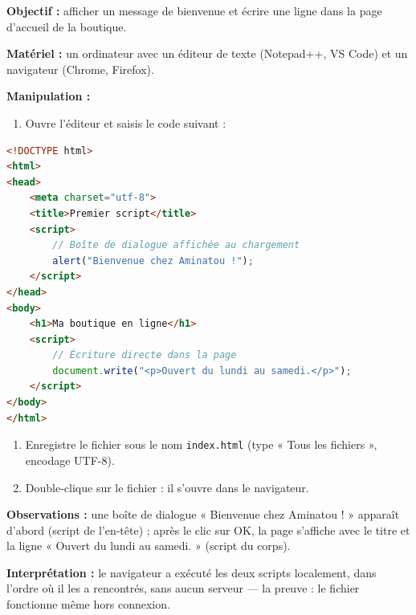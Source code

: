 \documentclass[11pt]{article}
\begin{document}
\begin{experience}
\textbf{Objectif :} afficher un message de bienvenue et écrire une ligne dans la page d'accueil de la boutique.

\textbf{Matériel :} un ordinateur avec un éditeur de texte (Notepad++, VS Code) et un navigateur (Chrome, Firefox).

\textbf{Manipulation :}
\begin{enumerate}
\item Ouvre l'éditeur et saisis le code suivant :
\end{enumerate}
\begin{lstlisting}[language=HTML]
<!DOCTYPE html>
<html>
<head>
    <meta charset="utf-8">
    <title>Premier script</title>
    <script>
        // Boîte de dialogue affichée au chargement
        alert("Bienvenue chez Aminatou !");
    </script>
</head>
<body>
    <h1>Ma boutique en ligne</h1>
    <script>
        // Écriture directe dans la page
        document.write("<p>Ouvert du lundi au samedi.</p>");
    </script>
</body>
</html>
\end{lstlisting}
\begin{enumerate}
\item[2.] Enregistre le fichier sous le nom \texttt{index.html} (type « Tous les fichiers », encodage UTF-8).
\item[3.] Double-clique sur le fichier : il s'ouvre dans le navigateur.
\end{enumerate}

\textbf{Observations :} une boîte de dialogue « Bienvenue chez Aminatou ! » apparaît d'abord (script de l'en-tête) ; après le clic sur OK, la page s'affiche avec le titre et la ligne « Ouvert du lundi au samedi. » (script du corps).

\textbf{Interprétation :} le navigateur a exécuté les deux scripts localement, dans l'ordre où il les a rencontrés, sans aucun serveur — la preuve : le fichier fonctionne même hors connexion.
\end{experience}
\end{document}
